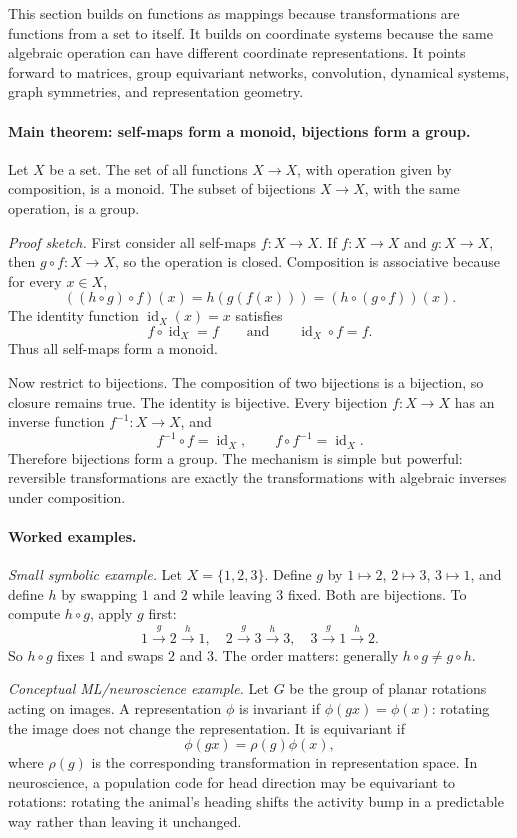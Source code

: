 This section builds on functions as mappings because transformations are functions from a set to itself. It builds on coordinate systems because the same algebraic operation can have different coordinate representations. It points forward to matrices, group equivariant networks, convolution, dynamical systems, graph symmetries, and representation geometry.

\paragraph{Main theorem: self-maps form a monoid, bijections form a group.}
Let \(X\) be a set. The set of all functions \(X\to X\), with operation given by composition, is a monoid. The subset of bijections \(X\to X\), with the same operation, is a group.

\emph{Proof sketch.} First consider all self-maps \(f:X\to X\). If \(f:X\to X\) and \(g:X\to X\), then \(g\circ f:X\to X\), so the operation is closed. Composition is associative because for every \(x\in X\),
\[
((h\circ g)\circ f)(x)=h(g(f(x)))=(h\circ(g\circ f))(x).
\]
The identity function \(\operatorname{id}_X(x)=x\) satisfies
\[
f\circ \operatorname{id}_X=f
\qquad\text{and}\qquad
\operatorname{id}_X\circ f=f.
\]
Thus all self-maps form a monoid.

Now restrict to bijections. The composition of two bijections is a bijection, so closure remains true. The identity is bijective. Every bijection \(f:X\to X\) has an inverse function \(f^{-1}:X\to X\), and
\[
f^{-1}\circ f=\operatorname{id}_X,\qquad
f\circ f^{-1}=\operatorname{id}_X.
\]
Therefore bijections form a group. The mechanism is simple but powerful: reversible transformations are exactly the transformations with algebraic inverses under composition.

\paragraph{Worked examples.}
\emph{Small symbolic example.} Let \(X=\{1,2,3\}\). Define \(g\) by \(1\mapsto2\), \(2\mapsto3\), \(3\mapsto1\), and define \(h\) by swapping \(1\) and \(2\) while leaving \(3\) fixed. Both are bijections. To compute \(h\circ g\), apply \(g\) first:
\[
1\xrightarrow{g}2\xrightarrow{h}1,\quad
2\xrightarrow{g}3\xrightarrow{h}3,\quad
3\xrightarrow{g}1\xrightarrow{h}2.
\]
So \(h\circ g\) fixes \(1\) and swaps \(2\) and \(3\). The order matters: generally \(h\circ g\ne g\circ h\).

\emph{Conceptual ML/neuroscience example.} Let \(G\) be the group of planar rotations acting on images. A representation \(\phi\) is invariant if \(\phi(gx)=\phi(x)\): rotating the image does not change the representation. It is equivariant if
\[
\phi(gx)=\rho(g)\phi(x),
\]
where \(\rho(g)\) is the corresponding transformation in representation space. In neuroscience, a population code for head direction may be equivariant to rotations: rotating the animal's heading shifts the activity bump in a predictable way rather than leaving it unchanged.

